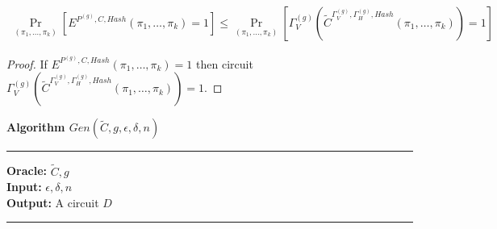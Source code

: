 \begin{lemma}
  \begin{align*}
  \underset{(\pi_1, \dots, \pi_k)}{\Pr}[E^{P^{(g)}, C, Hash}(\pi_1, \dots, \pi_k) = 1] \leq \underset{(\pi_1, \dots, \pi_k)}{\Pr}[\Gamma_V^{(g)} (\widetilde{C}^{\Gamma_V^{(g)}, \Gamma_H^{(g)}, Hash}(\pi_1, \dots, \pi_k)) = 1]
  \end{align*}
\end{lemma}

\begin{proof}
If $E^{P^{(g)}, C, Hash}(\pi_1, \dots, \pi_k) = 1$ then circuit $\Gamma_V^{(g)} (\widetilde{C}^{\Gamma_V^{(g)}, \Gamma_H^{(g)}, Hash}(\pi_1, \dots, \pi_k)) = 1$.
\end{proof}

\begin{codeblock}
  \textbf{Algorithm $Gen(\widetilde{C},g,\epsilon,\delta,n)$}
  \medskip

  \hrule

  \medskip

  \textbf{Oracle:} $\widetilde{C}, g$ \\
  \textbf{Input:}  $\epsilon, \delta, n$\\
  \textbf{Output:} A circuit $D$

  \medskip\hrule\medskip


\end{codeblock}
